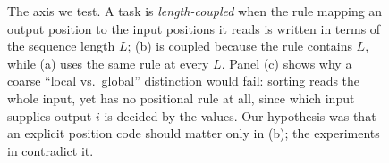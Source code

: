 \begin{figure}[t]
\caption{The axis we test. A task is \emph{length-coupled} when the rule mapping
an output position to the input positions it reads is written in terms of the
sequence length $L$; (b) is coupled because the rule contains $L$, while (a) uses
the same rule at every $L$. Panel (c) shows why a coarse ``local vs.\ global''
distinction would fail: sorting reads the whole input, yet has no positional rule
at all, since which input supplies output $i$ is decided by the values. Our
hypothesis was that an explicit position code should matter only in (b); the
experiments in  contradict it.}
\label{fig:taxonomy}
\end{figure}
